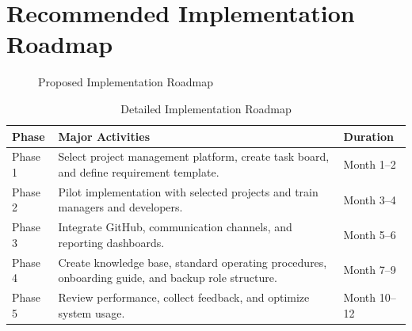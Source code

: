 \documentclass[12pt,a4paper]{report}
\begin{document}
\section{Recommended Implementation Roadmap}

\begin{figure}[H]
\centering
{}
\caption{Proposed Implementation Roadmap}
\end{figure}

\begin{table}[H]
\centering
\caption{Detailed Implementation Roadmap}
\renewcommand{\arraystretch}{1.3}
\begin{tabularx}{\textwidth}{|p{3cm}|X|p{3cm}|}
\hline
\rowcolor{secondary}
\textbf{Phase} & \textbf{Major Activities} & \textbf{Duration} \\
\hline
Phase 1 & Select project management platform, create task board, and define requirement template. & Month 1--2 \\
\hline
Phase 2 & Pilot implementation with selected projects and train managers and developers. & Month 3--4 \\
\hline
Phase 3 & Integrate GitHub, communication channels, and reporting dashboards. & Month 5--6 \\
\hline
Phase 4 & Create knowledge base, standard operating procedures, onboarding guide, and backup role structure. & Month 7--9 \\
\hline
Phase 5 & Review performance, collect feedback, and optimize system usage. & Month 10--12 \\
\hline
\end{tabularx}
\end{table}
\end{document}
